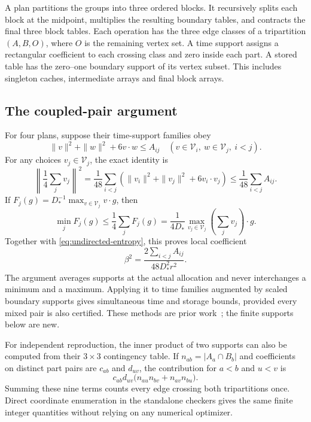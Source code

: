 A plan partitions the groups into three ordered blocks. It recursively
splits each block at the midpoint, multiplies the resulting boundary
tables, and contracts the final three block tables. Each operation has
the three edge classes of a tripartition $(A,B,O)$, where $O$ is the
remaining vertex set. A time support assigns a rectangular coefficient
to each crossing class and zero inside each part. A stored table has the
zero--one boundary support of its vertex subset. This includes singleton
caches, intermediate arrays and final block arrays.

\subsection{The coupled-pair argument}

For four plans, suppose their time-support families obey
\[
 \|v\|^2+\|w\|^2+6v\cdot w\le A_{ij}
 \quad(v\in\mathcal V_i,\ w\in\mathcal V_j,\ i<j).
\]
For any choices $v_j\in\mathcal V_j$, the exact identity is
\[
 \left\|\frac14\sum_jv_j\right\|^2
 =\frac1{48}\sum_{i<j}
       (\|v_i\|^2+\|v_j\|^2+6v_i\cdot v_j)
 \le\frac1{48}\sum_{i<j}A_{ij}.
\]
If $F_j(g)=D_*^{-1}\max_{v\in\mathcal V_j}v\cdot g$, then
\[
 \min_jF_j(g)\le\frac14\sum_jF_j(g)
 =\frac1{4D_*}\max_{v_j\in\mathcal V_j}
                         \left(\sum_jv_j\right)\cdot g.
\]
Together with \eqref{eq:undirected-entropy}, this proves local coefficient
\[
 \beta^2=\frac{2\sum_{i<j}A_{ij}}{48D_*^2r^2}.
\]
The argument averages supports at the actual allocation and never
interchanges a minimum and a maximum. Applying it to time families
augmented by scaled boundary supports gives simultaneous time and storage
bounds, provided every mixed pair is also certified. These methods are
prior work~\cite{pairwise,affinejoint}; the finite supports below are new.

For independent reproduction, the inner product of two supports can also
be computed from their $3\times3$ contingency table. If
$n_{ab}=|A_a\cap B_b|$ and coefficients on distinct part pairs are
$c_{ab}$ and $d_{uv}$, the contribution for $a<b$ and $u<v$ is
\[
 c_{ab}d_{uv}\bigl(n_{au}n_{bv}+n_{av}n_{bu}\bigr).
\]
Summing these nine terms counts every edge crossing both tripartitions
once. Direct coordinate enumeration in the standalone checkers gives the
same finite integer quantities without relying on any numerical optimizer.

